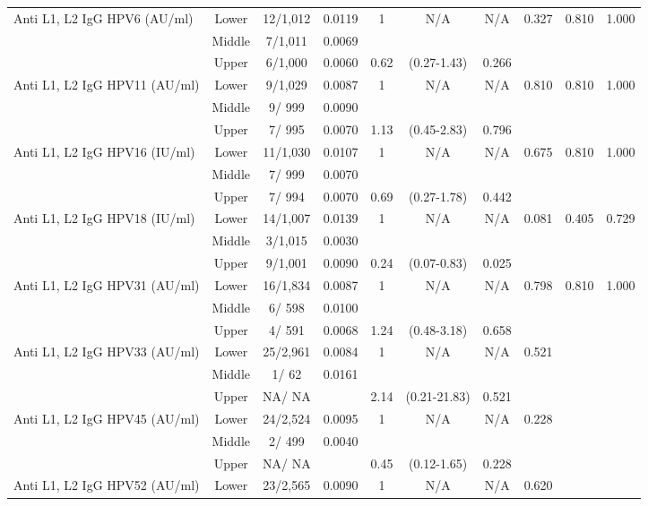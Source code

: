 \begin{longtable}{lccccccccc}
      Anti L1, L2 IgG HPV6 (AU/ml) & Lower & 12/1,012 & 0.0119 & 1 & N/A & N/A & 0.327 & 0.810 & 1.000 \\ 
   & Middle & 7/1,011 & 0.0069 &  &  &  &     &  &  \\ 
   & Upper & 6/1,000 & 0.0060 & 0.62 & (0.27-1.43) & 0.266 &     &  &  \\ 
  Anti L1, L2 IgG HPV11 (AU/ml) & Lower & 9/1,029 & 0.0087 & 1 & N/A & N/A & 0.810 & 0.810 & 1.000 \\ 
   & Middle & 9/  999 & 0.0090 &  &  &  &     &  &  \\ 
   & Upper & 7/  995 & 0.0070 & 1.13 & (0.45-2.83) & 0.796 &     &  &  \\ 
  Anti L1, L2 IgG HPV16 (IU/ml) & Lower & 11/1,030 & 0.0107 & 1 & N/A & N/A & 0.675 & 0.810 & 1.000 \\ 
   & Middle & 7/  999 & 0.0070 &  &  &  &     &  &  \\ 
   & Upper & 7/  994 & 0.0070 & 0.69 & (0.27-1.78) & 0.442 &     &  &  \\ 
  Anti L1, L2 IgG HPV18 (IU/ml) & Lower & 14/1,007 & 0.0139 & 1 & N/A & N/A & 0.081 & 0.405 & 0.729 \\ 
   & Middle & 3/1,015 & 0.0030 &  &  &  &     &  &  \\ 
   & Upper & 9/1,001 & 0.0090 & 0.24 & (0.07-0.83) & 0.025 &     &  &  \\ 
  Anti L1, L2 IgG HPV31 (AU/ml) & Lower & 16/1,834 & 0.0087 & 1 & N/A & N/A & 0.798 & 0.810 & 1.000 \\ 
   & Middle & 6/  598 & 0.0100 &  &  &  &     &  &  \\ 
   & Upper & 4/  591 & 0.0068 & 1.24 & (0.48-3.18) & 0.658 &     &  &  \\ 
  Anti L1, L2 IgG HPV33 (AU/ml) & Lower & 25/2,961 & 0.0084 & 1 & N/A & N/A & 0.521 &     &     \\ 
   & Middle & 1/   62 & 0.0161 &  &  &  &     &  &  \\ 
   & Upper & NA/   NA &      & 2.14 & (0.21-21.83) & 0.521 &     &  &  \\ 
  Anti L1, L2 IgG HPV45 (AU/ml) & Lower & 24/2,524 & 0.0095 & 1 & N/A & N/A & 0.228 &     &     \\ 
   & Middle & 2/  499 & 0.0040 &  &  &  &     &  &  \\ 
   & Upper & NA/   NA &      & 0.45 & (0.12-1.65) & 0.228 &     &  &  \\ 
  Anti L1, L2 IgG HPV52 (AU/ml) & Lower & 23/2,565 & 0.0090 & 1 & N/A & N/A & 0.620 &     &     \\ 

\end{longtable}
